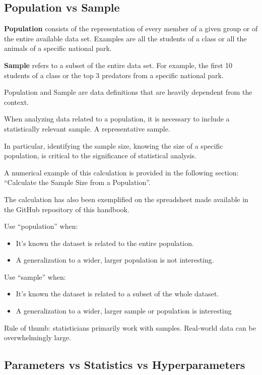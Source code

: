 \documentclass{article}
\begin{document}
\subsection{Population vs Sample}

\textbf{Population} consists of the representation of every member of a given group or of the entire available data set.
Examples are all the students of a class or all the animals of a specific national park.

\textbf{Sample} refers to a subset of the entire data set. 
For example, the first 10 students of a class or the top 3 predators from a specific national park.

Population and Sample are data definitions that are heavily dependent from the context.

When analyzing data related to a population, it is necessary to include a statistically relevant sample. A representative sample. 

In particular, identifying the sample size, knowing the size of a specific population, is critical to the significance of statistical analysis. 

A numerical example of this calculation is provided in the following section: “Calculate the Sample Size from a Population”.

The calculation has also been exemplified on the spreadsheet made available in the GitHub repository of this handbook.

Use “population” when:
\begin{itemize}
    \item It’s known the dataset is related to the entire population.
    \item A generalization to a wider, larger population is not interesting.
\end{itemize}

Use “sample” when:
\begin{itemize}
    \item It’s known the dataset is related to a subset of the whole dataset.
    \item A generalization to a wider, larger sample or population is interesting
\end{itemize}

Rule of thumb: statisticians primarily work with samples. Real-world data can be overwhelmingly large.

\subsection{Parameters vs Statistics vs Hyperparameters}
\end{document}
